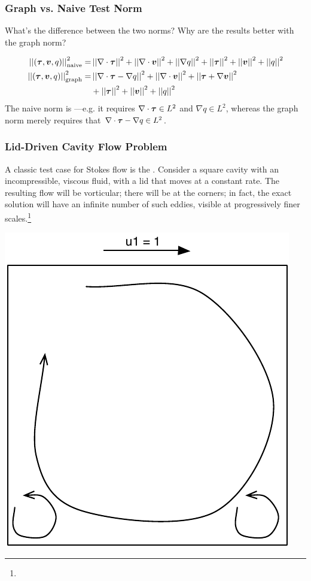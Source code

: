 \documentclass[mathserif]{beamer}
\newcommand{\NVRvect}[1]{\ensuremath\boldsymbol{#1}}
\newcommand{\vect}[1]{\ensuremath\boldsymbol{#1}}
\newcommand{\NVRtensor}[1]{\NVRvect{#1}}
\newcommand{\norm}[1]{\left|\left|#1\right|\right|}
\newcommand{\NVRgrad}{\nabla}
\newcommand{\NVRdiv}{\NVRgrad \cdot}
\newcommand{\pecosbold}[1]{{\color{pecos2}{#1}}}
\newcommand{\FootSize}{\scriptsize}
\begin{document}
\begin{frame}
\frametitle{Graph vs. Naive Test Norm}
What's the difference between the two norms?  Why are the results better with the graph norm?

\begin{align*}
\norm{(\NVRtensor{\tau},\vect{v}, q)}_{\rm naive}^{2} =& \norm{\NVRdiv \NVRtensor{\tau}}^{2} + \norm{\NVRdiv \vect{v}}^{2} + \norm{\NVRgrad q}^{2} + \norm{\NVRtensor{\tau}}^{2} + \norm{\vect{v}}^{2} + \norm{q}^{2}\\
\vspace{30mm}
\norm{(\NVRtensor{\tau},\vect{v}, q)}_{\rm graph}^{2} =& \norm{\NVRdiv \NVRtensor{\tau} - \NVRgrad q}^{2} + \norm{\NVRdiv \vect{v}}^{2} + \norm{ \NVRtensor{\tau} + \NVRgrad{\vect{v}}}^{2}\\ 
&+ \norm{\NVRtensor{\tau}}^{2} + \norm{\vect{v}}^{2} + \norm{q}^{2}
\end{align*}
\pause
The naive norm is \pecosbold{stronger}---e.g. it requires $\NVRdiv \NVRtensor{\tau} \in L^{2}$ and $\NVRgrad q \in L^{2}$, whereas the graph norm merely requires that $\NVRdiv \NVRtensor{\tau} - \NVRgrad q \in L^{2}$.  

\end{frame}

\begin{frame}
\frametitle{Lid-Driven Cavity Flow Problem}
A classic test case for Stokes flow is the \pecosbold{lid-driven cavity flow problem}.  Consider a square cavity with an incompressible, viscous fluid, with a lid that moves at a constant rate.  The resulting flow will be vorticular; there will be \pecosbold{Moffatt eddies} at the corners; in fact, the exact solution will have an infinite number of such eddies, visible at progressively finer scales.\footnote{\FootSize {}}
\begin{center}
{\includegraphics[scale=0.40]{../figures/cavity_flow_cartoon.pdf}}
\end{center}
\end{frame}
\end{document}

